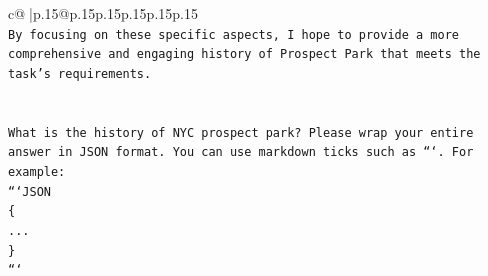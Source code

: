 \documentclass{article}
\begin{document}
{\begin{supertabular}{c@{$\;$}|p{.15\linewidth}@{}p{.15\linewidth}p{.15\linewidth}p{.15\linewidth}p{.15\linewidth}p{.15\linewidth}}
{{{\\ 
\texttt{By focusing on these specific aspects, I hope to provide a more comprehensive and engaging history of Prospect Park that meets the task's requirements.} \\
\\ 
\\ 
\texttt{What is the history of NYC prospect park? Please wrap your entire answer in JSON format. You can use markdown ticks such as ```. For example:} \\
\texttt{```JSON} \\
\texttt{\{} \\
\texttt{...} \\
\texttt{\}} \\
\texttt{```} \\
            }
        }
    }
     \\ \\


\end{supertabular}}
\end{document}
